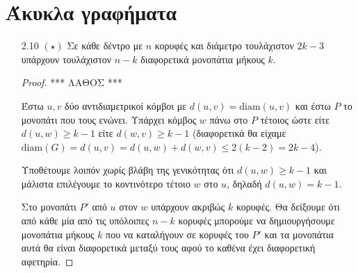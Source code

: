 \documentclass[a4paper, oneside, 11pt]{article}
\begin{document}
\section{Άκυκλα γραφήματα}

\begin{enumerate}
   \item[2.10 $(\star)$]
      Σε κάθε δέντρο με $n$ κορυφές και διάμετρο τουλάχιστον
      $2k - 3$ υπάρχουν τουλάχιστον $n-k$ διαφορετικά μονοπάτια
      μήκους $k$.

      \begin{proof}

      *** ΛΑΘΟΣ ***

      Έστω $u, v$ δύο αντιδιαμετρικοί κόμβοι με $d(u, v) = \text{diam}(u, v)$
      και έστω $P$ το μονοπάτι που τους ενώνει. Υπάρχει κόμβος $w$ πάνω στο
      $P$ τέτοιος ώστε είτε $d(u, w) \geq k-1$ είτε $d(w, v) \geq k-1$
      (διαφορετικά θα είχαμε $\text{diam}(G) = d(u, v) = d(u, w) + d(w, v) \leq
      2(k-2) = 2k - 4$).

      Υποθέτουμε λοιπόν χωρίς βλάβη της γενικότητας ότι $d(u, w) \geq k-1$
      και μάλιστα επιλέγουμε το κοντινότερο τέτοιο $w$ στο $u$, δηλαδή
      $d(u, w) = k-1$.
      
      Στο μονοπάτι $P'$ από $u$ στον $w$ υπάρχουν ακριβώς $k$ κορυφές.
      Θα δείξουμε ότι από κάθε μία από τις υπόλοιπες $n-k$ κορυφές
      μπορούμε να δημιουργήσουμε μονοπάτια μήκους $k$ που να καταλήγουν
      σε κορυφές του $P'$ και τα μονοπάτια αυτά θα είναι διαφορετικά
      μεταξύ τους αφού το καθένα έχει διαφορετική αφετηρία.

      \end{proof}
\end{enumerate}
\end{document}
